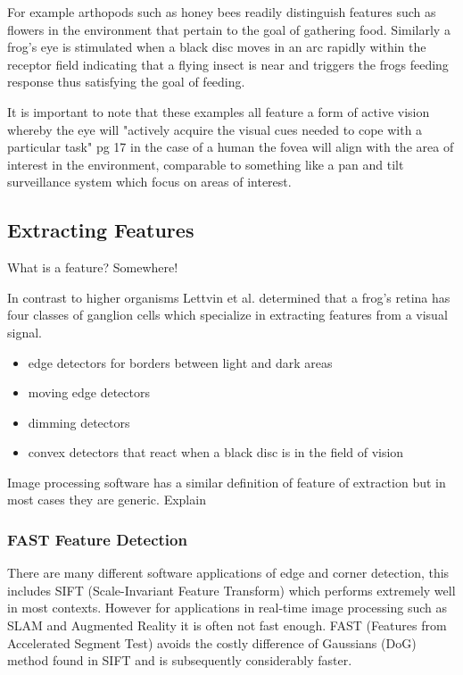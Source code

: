 \documentclass{mproj}
\begin{document}
For example arthopods such as honey bees readily distinguish features such as flowers in the environment that pertain to the goal of gathering food. Similarly a frog's eye is stimulated when a black disc moves in an arc rapidly within the receptor field indicating that a flying insect is near and triggers the frogs feeding response \cite{} thus satisfying the goal of feeding.

It is important to note that these examples all feature a form of active vision whereby the  eye will "actively acquire the visual cues needed to cope with a particular task" pg 17  in the case of a human the fovea will align with the area of interest in the environment, comparable to something like a pan and tilt surveillance system which focus on areas of interest.
 
 
\subsection{Extracting Features}

What is a feature? Somewhere!

In contrast to higher organisms Lettvin et al. \cite{} determined that a frog's retina has four  classes of ganglion cells which specialize in extracting features from a visual signal. 
\begin{itemize}
  \item edge detectors for borders between light and dark areas
  \item moving edge detectors
  \item dimming detectors 
  \item convex detectors that react when a black disc is in the field of vision
\end{itemize}

Image processing software has a similar definition of feature of extraction but in most cases they are generic. Explain

\subsubsection{FAST Feature Detection}

There are many different software applications of edge and corner detection, this includes SIFT (Scale-Invariant Feature Transform) which performs extremely well in most contexts. \cite{Mikolajczyk} However for applications in real-time image processing such as SLAM and Augmented Reality it is often not fast enough. FAST (Features from Accelerated Segment Test) \cite{rosten_2006_machine}\cite{rosten_2005_annotations} avoids the costly difference of Gaussians (DoG) method found in SIFT and is subsequently considerably faster.
\end{document}
